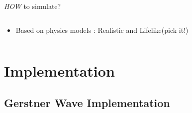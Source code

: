 \documentclass[handout,t]{beamer}
\begin{document}
\begin{frame}[t]{\emph{HOW} to simulate?}
\begin{columns}
\begin{column}
\begin{itemize}
        \item Based on physics models : Realistic and Lifelike(pick it!\checkmark)
        \begin{figure}[thpb]
          \centering
        \label{fig:system}
        \end{figure}
      \end{itemize}
    \end{column}%
  \end{columns}
\end{frame}


\section{Implementation}

\subsection{Gerstner Wave Implementation}
\end{document}
